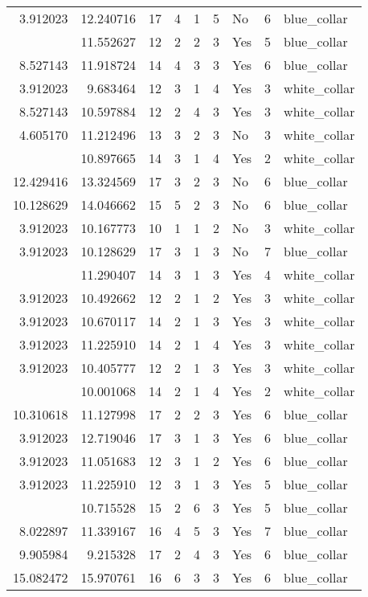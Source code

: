 \documentclass[
]{article}
\begin{document}
\begin{longtable}[t]{rrrrrllrl}
3.912023 & 12.240716 & 17 & 4 & 1 & 5 & No & 6 & blue\_collar\\
\addlinespace
10.310618 & 11.552627 & 12 & 2 & 2 & 3 & Yes & 5 & blue\_collar\\
8.527143 & 11.918724 & 14 & 4 & 3 & 3 & Yes & 6 & blue\_collar\\
3.912023 & 9.683464 & 12 & 3 & 1 & 4 & Yes & 3 & white\_collar\\
8.527143 & 10.597884 & 12 & 2 & 4 & 3 & Yes & 3 & white\_collar\\
4.605170 & 11.212496 & 13 & 3 & 2 & 3 & No & 3 & white\_collar\\
\addlinespace
3.912023 & 10.897665 & 14 & 3 & 1 & 4 & Yes & 2 & white\_collar\\
12.429416 & 13.324569 & 17 & 3 & 2 & 3 & No & 6 & blue\_collar\\
10.128629 & 14.046662 & 15 & 5 & 2 & 3 & No & 6 & blue\_collar\\
3.912023 & 10.167773 & 10 & 1 & 1 & 2 & No & 3 & white\_collar\\
3.912023 & 10.128629 & 17 & 3 & 1 & 3 & No & 7 & blue\_collar\\
\addlinespace
3.912023 & 11.290407 & 14 & 3 & 1 & 3 & Yes & 4 & white\_collar\\
3.912023 & 10.492662 & 12 & 2 & 1 & 2 & Yes & 3 & white\_collar\\
3.912023 & 10.670117 & 14 & 2 & 1 & 3 & Yes & 3 & white\_collar\\
3.912023 & 11.225910 & 14 & 2 & 1 & 4 & Yes & 3 & white\_collar\\
3.912023 & 10.405777 & 12 & 2 & 1 & 3 & Yes & 3 & white\_collar\\
\addlinespace
3.912023 & 10.001068 & 14 & 2 & 1 & 4 & Yes & 2 & white\_collar\\
10.310618 & 11.127998 & 17 & 2 & 2 & 3 & Yes & 6 & blue\_collar\\
3.912023 & 12.719046 & 17 & 3 & 1 & 3 & Yes & 6 & blue\_collar\\
3.912023 & 11.051683 & 12 & 3 & 1 & 2 & Yes & 6 & blue\_collar\\
3.912023 & 11.225910 & 12 & 3 & 1 & 3 & Yes & 5 & blue\_collar\\
\addlinespace
8.527143 & 10.715528 & 15 & 2 & 6 & 3 & Yes & 5 & blue\_collar\\
8.022897 & 11.339167 & 16 & 4 & 5 & 3 & Yes & 7 & blue\_collar\\
9.905984 & 9.215328 & 17 & 2 & 4 & 3 & Yes & 6 & blue\_collar\\
15.082472 & 15.970761 & 16 & 6 & 3 & 3 & Yes & 6 & blue\_collar\\

\end{longtable}
\end{document}
